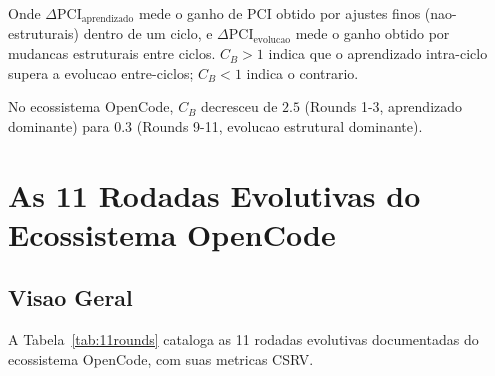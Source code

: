 \documentclass[5p]{elsarticle}
\begin{document}
Onde $\Delta \text{PCI}_{\text{aprendizado}}$ mede o ganho de PCI obtido por
ajustes finos (nao-estruturais) dentro de um ciclo, e
$\Delta \text{PCI}_{\text{evolucao}}$ mede o ganho obtido por mudancas
estruturais entre ciclos. $C_B > 1$ indica que o aprendizado intra-ciclo
supera a evolucao entre-ciclos; $C_B < 1$ indica o contrario.

No ecossistema OpenCode, $C_B$ decresceu de $2.5$ (Rounds 1-3, aprendizado
dominante) para $0.3$ (Rounds 9-11, evolucao estrutural dominante).

\section{As 11 Rodadas Evolutivas do Ecossistema OpenCode}

\subsection{Visao Geral}

A Tabela~\ref{tab:11rounds} cataloga as 11 rodadas evolutivas documentadas
do ecossistema OpenCode, com suas metricas CSRV.
\end{document}
